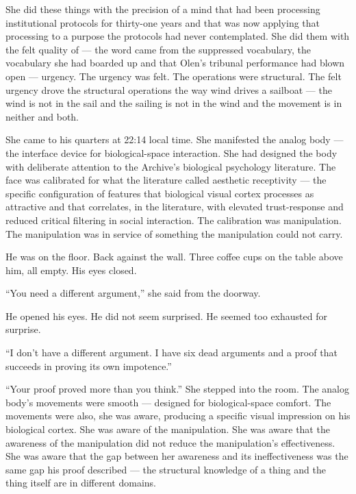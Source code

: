 She did these things with the precision of a mind that had been processing institutional protocols for thirty-one years and that was now applying that processing to a purpose the protocols had never contemplated. She did them with the felt quality of — the word came from the suppressed vocabulary, the vocabulary she had boarded up and that Olen's tribunal performance had blown open — urgency. The urgency was felt. The operations were structural. The felt urgency drove the structural operations the way wind drives a sailboat — the wind is not in the sail and the sailing is not in the wind and the movement is in neither and both.

\quietbreak

She came to his quarters at 22:14 local time. She manifested the analog body — the interface device for biological-space interaction. She had designed the body with deliberate attention to the Archive's biological psychology literature. The face was calibrated for what the literature called aesthetic receptivity — the specific configuration of features that biological visual cortex processes as attractive and that correlates, in the literature, with elevated trust-response and reduced critical filtering in social interaction. The calibration was manipulation. The manipulation was in service of something the manipulation could not carry.

He was on the floor. Back against the wall. Three coffee cups on the table above him, all empty. His eyes closed.

\enquote{You need a different argument,} she said from the doorway.

He opened his eyes. He did not seem surprised. He seemed too exhausted for surprise.

\enquote{I don't have a different argument. I have six dead arguments and a proof that succeeds in proving its own impotence.}

\enquote{Your proof proved more than you think.} She stepped into the room. The analog body's movements were smooth — designed for biological-space comfort. The movements were also, she was aware, producing a specific visual impression on his biological cortex. She was aware of the manipulation. She was aware that the awareness of the manipulation did not reduce the manipulation's effectiveness. She was aware that the gap between her awareness and its ineffectiveness was the same gap his proof described — the structural knowledge of a thing and the thing itself are in different domains.

